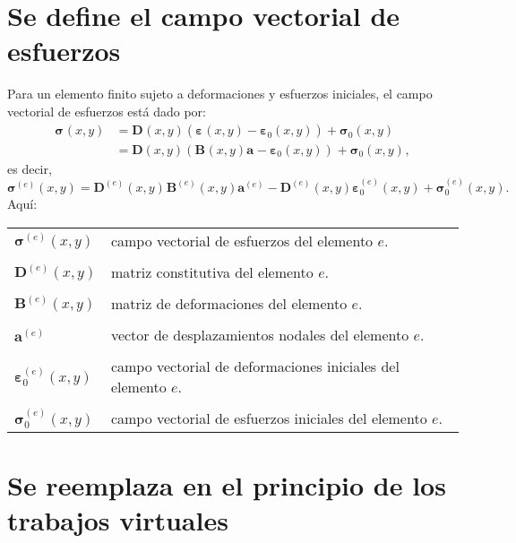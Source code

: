 \documentclass[12pt,letterpaper, landscape]{article}
\newcommand{\e}{{}}
\newcommand{\ve}[1]{{\boldsymbol{#1}}}
\newcommand{\ma}[1]{{\boldsymbol{#1}}}
\begin{document}
\newpage

\section{Se define el campo vectorial de esfuerzos}

Para un elemento finito sujeto a deformaciones y esfuerzos iniciales, el campo vectorial de esfuerzos está dado por:
\begin{align}
\ve{\sigma}^\e(x,y) &= \ma{D}^\e(x,y)\left(\ve{\varepsilon}^\e(x,y) - \ve{\varepsilon}_0^\e(x,y)\right) + \ve{\sigma}_0^\e(x,y) \\
&= \ma{D}(x,y)\left(\ma{B}^\e(x,y)\ve{a}^\e - \ve{\varepsilon}_0(x,y)\right)^\e + \ve{\sigma}_0(x,y)^\e,
\end{align}
es decir,
\begin{equation}
\ve{\sigma}^{(e)}(x,y) =  \ma{D}^{(e)}(x,y)^\e\ma{B}^{(e)}(x,y)\ve{a}^{(e)} - \ma{D}^{(e)}(x,y)\ve{\varepsilon}_0^{(e)}(x,y) + \ve{\sigma}_0^{(e)}(x,y). \label{eq:constitutiva}
\end{equation}
Aquí:

\begin{tabular}{ll}
   $\ve{\sigma}^{(e)}(x,y)$     & campo vectorial de esfuerzos del elemento $e$.\\
\\[-1ex]   
   $\ma{D}^{(e)}(x,y)$ & matriz constitutiva del elemento $e$. \\
\\[-1ex]
   $\ma{B}^{(e)}(x,y)$  & {matriz de deformaciones del elemento} $e$.\\
   \\[-1ex]
   $\ve{a}^{(e)}$       & {vector de desplazamientos nodales del elemento} $e$. \\
   \\[-1ex]
   $\ve{\varepsilon}_0^{(e)}(x,y)$ & campo vectorial de deformaciones iniciales del elemento $e$. \\
   \\[-1ex]
   $\ve{\sigma}_0^{(e)}(x,y)$ & campo vectorial de esfuerzos iniciales del elemento $e$.   
\end{tabular} 

\newpage

\section{Se reemplaza en el principio de los trabajos virtuales}
\end{document}
